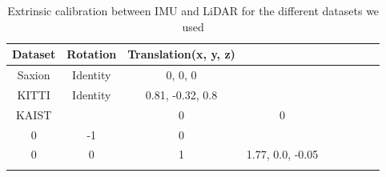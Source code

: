 \begin{table}[H]
	\centering
	\caption{Extrinsic calibration between IMU and LiDAR for the different datasets we used}
	\begin{tabular}{ccccclclc}
		\toprule
		Dataset 	& 	Rotation 	 		&Translation(x, y, z)\\
		\midrule
		Saxion 	& Identity 			& 0,	0,		0	\\
		KITTI 	& Identity 			& 0.81, -0.32, 0.8	\\
		KAIST 	& \(\begin{bmatrix}
			-1 & 0 & 0 \\
			0 & -1 & 0 \\
			0 & 0 & 1
		\end{bmatrix}\) 			& 1.77, 0.0, -0.05	\\
		\bottomrule& & 
	\end{tabular}
	\label{tab:calibration}
\end{table}
%
%
%
